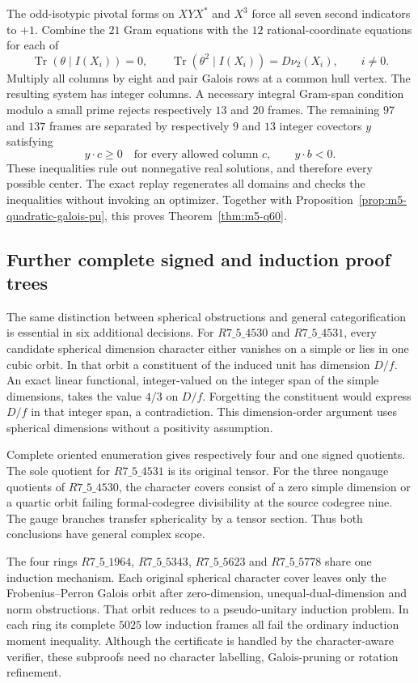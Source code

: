 The odd-isotypic pivotal forms on $XYX^*$ and $X^3$ force all seven
second indicators to $+1$.  Combine the $21$ Gram equations with the
$12$ rational-coordinate equations for each of
\[
 \operatorname{Tr}(\theta\mid I(X_i))=0,\qquad
 \operatorname{Tr}(\theta^2\mid I(X_i))=D\nu_2(X_i),\qquad i\ne0.
\]
Multiply all columns by eight and pair Galois rows at a common hull
vertex.  The resulting system has integer columns.  A necessary integral
Gram-span condition modulo a small prime rejects respectively $13$ and
$20$ frames.  The remaining $97$ and $137$ frames are separated by
respectively $9$ and $13$ integer covectors $y$ satisfying
\[
            y\cdot c\geq0\quad\text{for every allowed column }c,
            \qquad y\cdot b<0.
\]
These inequalities rule out nonnegative real solutions, and therefore
every possible center.  The exact replay regenerates all domains and
checks the inequalities without invoking an optimizer.  Together with
Proposition~\ref{prop:m5-quadratic-galois-pu}, this proves
Theorem~\ref{thm:m5-q60}.

\subsection{Further complete signed and induction proof trees}
\label{sec:m5-complete-trees}
The same distinction between spherical obstructions and general
categorification is essential in six additional decisions.
For $R7\_5\_4530$ and $R7\_5\_4531$, every candidate spherical
dimension character either vanishes on a simple or lies in one cubic
orbit.  In that orbit a constituent of the induced unit has dimension
$D/f$.  An exact linear functional, integer-valued on the integer span
of the simple dimensions, takes the value $4/3$ on $D/f$.
Forgetting the constituent would express $D/f$ in that integer span,
a contradiction.  This dimension-order argument uses spherical
dimensions without a positivity assumption.

Complete oriented enumeration gives respectively four and one signed
quotients.  The sole quotient for $R7\_5\_4531$ is its original
tensor.  For the three nongauge quotients of $R7\_5\_4530$, the
character covers consist of a zero simple dimension or a quartic orbit
failing formal-codegree divisibility at the source codegree nine.
The gauge branches transfer sphericality by a tensor section.  Thus
both conclusions have general complex scope.

The four rings $R7\_5\_1964$, $R7\_5\_5343$, $R7\_5\_5623$
and $R7\_5\_5778$ share one induction mechanism.  Each original
spherical character cover leaves only the Frobenius--Perron Galois
orbit after zero-dimension, unequal-dual-dimension and norm obstructions.
That orbit reduces to a pseudo-unitary induction problem.  In each
ring its complete $5025$ low induction frames all fail the ordinary
induction moment inequality.  Although the certificate is handled by
the character-aware verifier, these subproofs need no character
labelling, Galois-pruning or rotation refinement.

